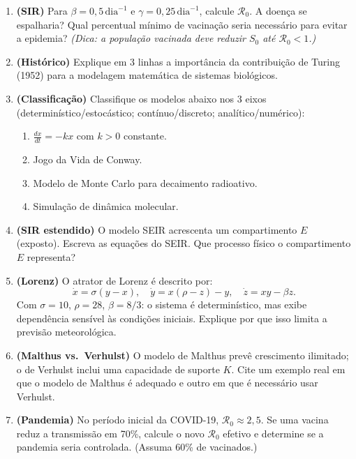 \documentclass[12pt,a4paper]{article}
\begin{document}
\begin{enumerate}
  \item \textbf{(SIR)} Para $\beta=0{,}5\,\text{dia}^{-1}$ e $\gamma=0{,}25\,\text{dia}^{-1}$, calcule $\mathcal{R}_0$. A doen\c{c}a se espalharia? Qual percen\-tual m\'inimo de vacina\c{c}\~ao seria necess\'ario para evitar a epidemia?
  \textit{(Dica: a popula\c{c}\~ao vacinada deve reduzir $S_0$ at\'e $\mathcal{R}_0 < 1$.)}
  
  \item \textbf{(Hist\'orico)} Explique em 3 linhas a import\^ancia da contribui\c{c}\~ao de Turing (1952) para a modelagem matem\'atica de sistemas biol\'ogicos.
  
  \item \textbf{(Classifica\c{c}\~ao)} Classifique os modelos abaixo nos 3 eixos (determin\'istico/estoc\'astico; cont\'inuo/discreto; anal\'itico/num\'erico):
    \begin{enumerate}
      \item[$a.$] $\frac{dx}{dt} = -kx$ com $k>0$ constante.
      \item[$b.$] Jogo da Vida de Conway.
      \item[$c.$] Modelo de Monte Carlo para decaimento radioativo.
      \item[$d.$] Simula\c{c}\~ao de din\^amica molecular.
    \end{enumerate}
  
  \item \textbf{(SIR estendido)} O modelo SEIR acrescenta um compartimento $E$ (exposto). Escreva as equa\c{c}\~oes do SEIR. Que processo f\'isico o compartimento $E$ representa?
  
  \item \textbf{(Lorenz)} O atrator de Lorenz \'e descrito por:
    \[
    \dot x = \sigma(y-x),\quad \dot y = x(\rho-z)-y,\quad \dot z = xy-\beta z.
    \]
    Com $\sigma=10$, $\rho=28$, $\beta=8/3$: o sistema \'e determin\'istico, mas exibe depend\^encia sens\'ivel \`as condi\c{c}\~oes iniciais. Explique por que isso limita a previs\~ao meteorol\'ogica.
  
  \item \textbf{(Malthus vs.\ Verhulst)} O modelo de Malthus prev\^e crescimento ilimitado; o de Verhulst inclui uma capacidade de suporte $K$. Cite um exemplo real em que o modelo de Malthus \'e adequado e outro em que \'e necess\'ario usar Verhulst.
  
  \item \textbf{(Pandemia)} No per\'iodo inicial da COVID-19, $\mathcal{R}_0 \approx 2{,}5$. Se uma vacina reduz a transmiss\~ao em 70\%, calcule o novo $\mathcal{R}_0$ efetivo e determine se a pandemia seria controlada. (Assuma 60\% de vacinados.)
\end{enumerate}
\end{document}
